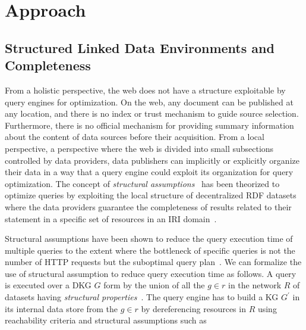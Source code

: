 \section{Approach}



\subsection{Structured Linked Data Environments and Completeness}
From a holistic perspective, the web does not have a structure exploitable by query engines for optimization.
On the web, any document can be published at any location, and there is no index or trust mechanism to guide source selection.
Furthermore, there is no official mechanism for providing summary information about the content of data sources before their acquisition.
From a local perspective, a perspective where the web is divided into small subsections controlled by data providers, data publishers can implicitly or explicitly organize their data  
in a way that a query engine could exploit its organization for query optimization.
The concept of \emph{structural assumptions}~\cite{Taelman2023} has been theorized to optimize queries by exploiting the local structure of decentralized RDF datasets where the data providers 
guarantee the completeness of results related to their statement in a specific set of resources in an IRI domain~\cite{Bogaerts2021LinkTW}.

Structural assumptions have been shown to reduce the query execution time of multiple queries to the extent where the bottleneck of specific queries is not the number of HTTP requests but the suboptimal query plan~\cite{Taelman2023, eschauzier_quweda_linkqueue_2023}.
We can formalize the use of structural assumption to reduce query execution time as follows.
A query is executed over a DKG $G$ form by the union of all the $g \in r$ in the network $R$ of datasets having \emph{structural properties}~\cite{Taelman2023}.
The query engine has to build a KG $G^{\prime}$ in its internal data store from the  $g \in r$ by dereferencing resources in $R$ using reachability criteria and structural assumptions 
such as

